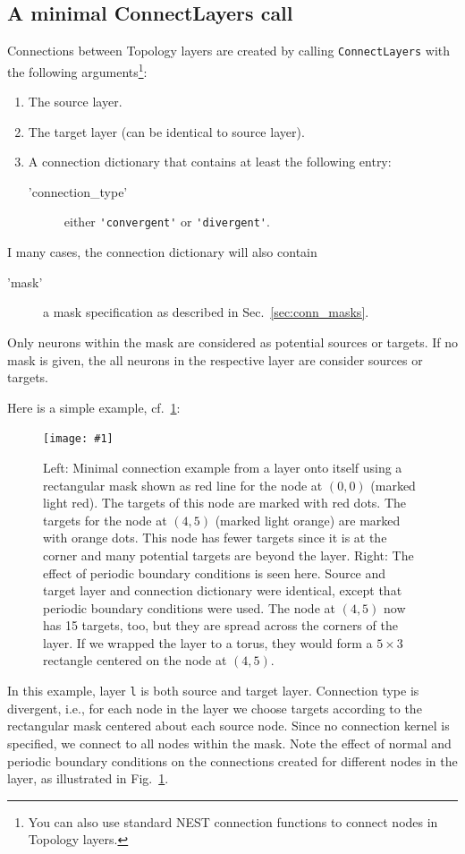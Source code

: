 \documentclass[a4paper,12pt]{report}
\newcommand{\scriptfig}[4]{%
\begin{figure}
\centerline{\texttt{[image: \#1]}}
\caption[#3]{#4}
\label{fig:#1}
\end{figure}%
}
\begin{document}
\subsection{A minimal ConnectLayers call}\label{sec:minimalcall}
Connections between Topology layers are created by calling
\lstinline!ConnectLayers! with the following arguments\footnote{You
  can also use standard NEST connection functions to connect nodes in
  Topology layers.}:
\begin{enumerate}
\item The source layer.
\item The target layer (can be identical to source layer).
\item A connection dictionary that contains at least the following entry:
\begin{description}
\item['connection\_type'] either \lstinline!'convergent'!
  or \lstinline!'divergent'!.
\end{description}
\end{enumerate}
I many cases, the connection dictionary will also contain
\begin{description}
\item['mask'] a mask specification as described in
  Sec.~\ref{sec:conn_masks}.
\end{description}
Only neurons within the mask are considered as potential sources or
targets. If no mask is given, the all neurons in the respective layer
are consider sources or targets.

Here is a simple example, cf.~\ref{fig:conn1}:
%

\scriptfig{conn1}{0.9}{Minimal connection example}%
{Left: Minimal connection example from a layer onto itself using a
  rectangular mask shown as red line for the node at $(0,0)$ (marked
  light red). The targets of this node are marked with red dots. The targets
  for the node at $(4,5)$ (marked light orange) are marked with orange
  dots. This node has fewer targets since it is at the corner and many
  potential targets are beyond the layer.
Right: The effect of periodic boundary conditions\index{periodic
  boundary cond.} is seen here. Source and target layer and connection dictionary
were identical, except that periodic boundary conditions were
used. The node at $(4,5)$ now has 15 targets, too, but they are spread
across the corners of the layer. If we wrapped the layer to a torus,
they would form a $5\times 3$ rectangle centered on the node at $(4,5)$.}
%
In this example, layer \lstinline!l! is both source and target
layer. Connection type is divergent, i.e., for each node in the layer
we choose targets according to the rectangular mask centered about
each source node. Since no connection kernel is specified, we connect
to all nodes within the mask. Note the effect of normal and periodic
boundary conditions on the connections created for different nodes in
the layer, as illustrated in Fig.~\ref{fig:conn1}.
\end{document}
